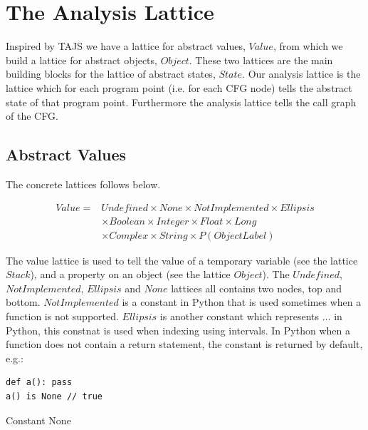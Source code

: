 \chapter{The Analysis Lattice}
Inspired by TAJS we have a lattice for abstract values, $Value$, from which we build a lattice for abstract objects, $Object$. These two lattices are the main building blocks for the lattice of abstract states, $State$. Our analysis lattice is the lattice which for each program point (i.e. for each CFG node) tells the abstract state of that program point. Furthermore the analysis lattice tells the call graph of the CFG.

\section{Abstract Values}
The concrete lattices follows below.

\begin{eqnarray*}
Value = & Undefined \times None \times NotImplemented \times Ellipsis \\
        & \times Boolean \times Integer \times Float \times Long \\
        & \times Complex \times String \times P(ObjectLabel)
\end{eqnarray*}

The value lattice is used to tell the value of a temporary variable (see the lattice $Stack$), and a property on an object (see the lattice $Object$). The $Undefined$, $NotImplemented$, $Ellipsis$ and $None$ lattices all contains two nodes, top and bottom. $NotImplemented$ is a constant in Python that is used sometimes when a function is not supported. $Ellipsis$ is another constant which represents $\dots$ in Python, this constnat is used when indexing using intervals. In Python when a function does not contain a return statement, the constant \cite{pyref.constants} is returned by default, e.g.:

\begin{listing}[H]
	\begin{verbatim}
def a(): pass
a() is None // true
	\end{verbatim}
	\caption{Constant None}\label{code:NoneExample}
\end{listing}

